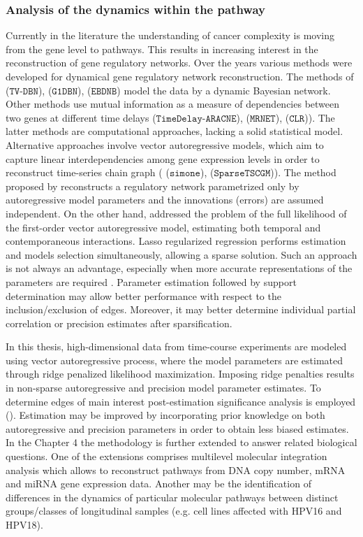 \subsubsection{Analysis of the dynamics within the pathway}

Currently in the literature the understanding of cancer complexity is moving from the gene level to pathways. This results in increasing interest in the reconstruction of gene regulatory networks. Over the years various methods were developed for dynamical gene regulatory network reconstruction. The methods of \cite{Song2009} ($\texttt{TV-DBN}$), \cite{Lebre2009} ($\texttt{G1DBN}$), \cite{Rau2010} ($\texttt{EBDNB}$) model the data by a dynamic Bayesian network. Other methods use mutual information as a measure of dependencies between two genes at different time delays \cite{Zoppoli2010} ($\texttt{TimeDelay-ARACNE}$), \cite{Meyer2007} ($\texttt{MRNET}$), \cite{Faith2007} ($\texttt{CLR}$)). The latter methods are computational approaches, lacking a solid statistical model. Alternative approaches involve vector autoregressive models, which aim to capture linear interdependencies among gene expression levels in order to reconstruct time-series chain graph (\cite{Charbonnier2010} ($\texttt{simone}$), \cite{Abegaz2013} ($\texttt{SparseTSCGM}$)). The method proposed by \cite{Charbonnier2010} reconstructs a regulatory network parametrized only by autoregressive model parameters and the innovations (errors) are assumed independent. On the other hand, \cite{Abegaz2013} addressed the problem of the full likelihood of the first-order vector autoregressive model, estimating both temporal and contemporaneous interactions. Lasso regularized regression performs estimation and models selection simultaneously, allowing a sparse solution. Such an approach is not always an advantage, especially when more accurate representations of the parameters are required \cite{Wieringen2016}. Parameter estimation followed by support determination may allow better performance with respect to the inclusion/exclusion of edges. Moreover, it may better determine individual partial correlation or precision estimates after sparsification.

In this thesis, high-dimensional data from time-course experiments are modeled using vector autoregressive process, where the model parameters are estimated through ridge penalized likelihood maximization. Imposing ridge penalties results in non-sparse autoregressive and precision model parameter estimates. To determine edges of main interest post-estimation significance analysis is employed (\cite{Efron2004, Strimmer2008}). Estimation may be improved by incorporating prior knowledge on both autoregressive and precision parameters in order to obtain less biased estimates. In the Chapter 4 the methodology is further extended to answer related biological questions. One of the extensions comprises multilevel molecular integration analysis which allows to reconstruct pathways from DNA copy number, mRNA and miRNA gene expression data. Another may be the identification of differences in the dynamics of particular molecular pathways between distinct groups/classes of longitudinal samples (e.g. cell lines affected with HPV16 and HPV18).

